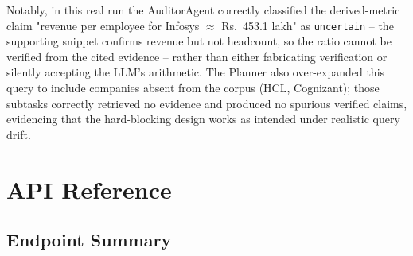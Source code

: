 \documentclass[11pt,a4paper]{report}
\newcommand{\code}[1]{\texttt{#1}}
\begin{document}
Notably, in this real run the AuditorAgent correctly classified the derived-metric
claim "revenue per employee for Infosys $\approx$ Rs.\ 453.1 lakh" as
\code{uncertain} -- the supporting snippet confirms revenue but not headcount, so the
ratio cannot be verified from the cited evidence -- rather than either fabricating
verification or silently accepting the LLM's arithmetic. The Planner also
over-expanded this query to include companies absent from the corpus (HCL,
Cognizant); those subtasks correctly retrieved no evidence and produced no spurious
verified claims, evidencing that the hard-blocking design works as intended under
realistic query drift.

\chapter{API Reference}

\section{Endpoint Summary}
\end{document}

